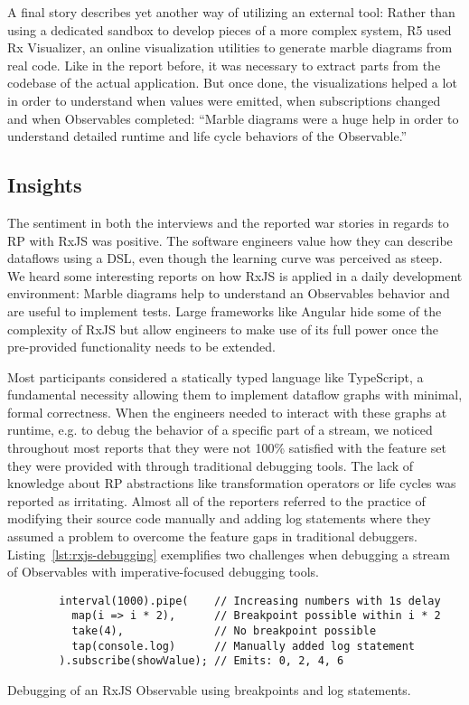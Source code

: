 \documentclass[12pt,a4paper]{article}
\begin{document}
A final story describes yet another way of utilizing an external tool: Rather than using a dedicated sandbox to develop pieces of a more complex system, R5 used Rx Visualizer, an online visualization utilities to generate marble diagrams from real code. Like in the report before, it was necessary to extract parts from the codebase of the actual application. But once done, the visualizations helped a lot in order to understand when values were emitted, when subscriptions changed and when Observables completed: ``Marble diagrams were a huge help in order to understand detailed runtime and life cycle behaviors of the Observable.''

\subsection{Insights}

The sentiment in both the interviews and the reported war stories in regards to RP with RxJS was positive. The software engineers value how they can describe dataflows using a DSL, even though the learning curve was perceived as steep. We heard some interesting reports on how RxJS is applied in a daily development environment: Marble diagrams help to understand  an Observables behavior and are useful to implement tests. Large frameworks like Angular hide some of the complexity of RxJS but allow engineers to make use of its full power once the pre-provided functionality needs to be extended.

Most participants considered a statically typed language like TypeScript, a fundamental necessity allowing them to implement dataflow graphs with minimal, formal correctness. When the engineers needed to interact with these graphs at runtime, e.g. to debug the behavior of a specific part of a stream, we noticed throughout most reports that they were not 100\% satisfied with the feature set they were provided with through traditional debugging tools. The lack of knowledge about RP abstractions like transformation operators or life cycles was reported as irritating. Almost all of the reporters referred to the practice of modifying their source code manually and adding log statements where they assumed a problem to overcome the feature gaps in traditional debuggers. Listing~\ref{lst:rxjs-debugging} exemplifies two challenges when debugging a stream of Observables with imperative-focused debugging tools.

\begin{listing}[H]
	\begin{verbatim}
		interval(1000).pipe(    // Increasing numbers with 1s delay
		  map(i => i * 2),      // Breakpoint possible within i * 2
		  take(4),              // No breakpoint possible
		  tap(console.log)      // Manually added log statement
		).subscribe(showValue); // Emits: 0, 2, 4, 6
	\end{verbatim}
	\caption{Debugging of an RxJS Observable using breakpoints and log statements.}
	\label{lst:rxjs-debugging}
\end{listing}
\end{document}
